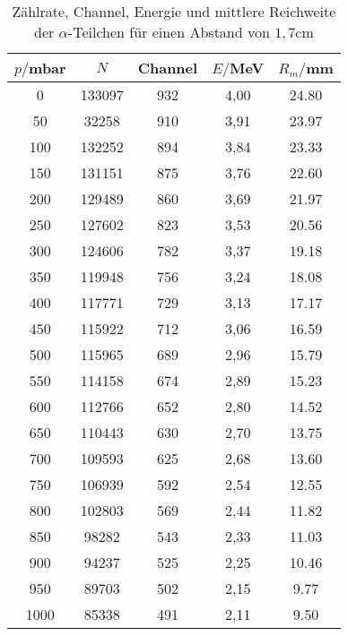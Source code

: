 \begin{table}[H]
  \centering
  \caption{Zählrate, Channel, Energie und mittlere Reichweite der $\alpha$-Teilchen für einen Abstand von $1,7$cm}
  \label{tab:Spannungsamplitude}
  \begin{tabular}{c c c c c}
    \toprule
    $p/$mbar & $N$ & Channel & $E/$MeV & $R_m/$mm \\
    \midrule
    0	  & 133097  & 932 &   4,00 & 24.80       \\
    50	&  32258  & 910 &   3,91 & 23.97      \\
    100 & 132252  & 894 &   3,84 & 23.33       \\
    150 & 131151  & 875 &   3,76 & 22.60       \\
    200 & 129489  & 860 &   3,69 & 21.97       \\
    250 & 127602  & 823 &   3,53 & 20.56       \\
    300 & 124606  & 782 &   3,37 & 19.18       \\
    350 & 119948  & 756 &   3,24 & 18.08       \\
    400 & 117771  & 729 &   3,13 & 17.17       \\
    450 & 115922  & 712 &   3,06 & 16.59       \\
    500 & 115965  & 689 &   2,96 & 15.79       \\
    550 & 114158  & 674 &   2,89 & 15.23       \\
    600 & 112766  & 652 &   2,80 & 14.52       \\
    650 & 110443  & 630 &   2,70 & 13.75       \\
    700 & 109593  & 625 &   2,68 & 13.60       \\
    750 & 106939  & 592 &   2,54 & 12.55      \\
    800 & 102803  & 569 &   2,44 & 11.82      \\
    850 & 98282	  & 543 &   2,33 & 11.03      \\
    900 & 94237	  & 525 &   2,25 & 10.46   \\
    950 & 89703	  & 502 &   2,15 & 9.77     \\
    1000& 85338   & 491 &   2,11 & 9.50    \\
    \bottomrule
  \end{tabular}
\end{table}






